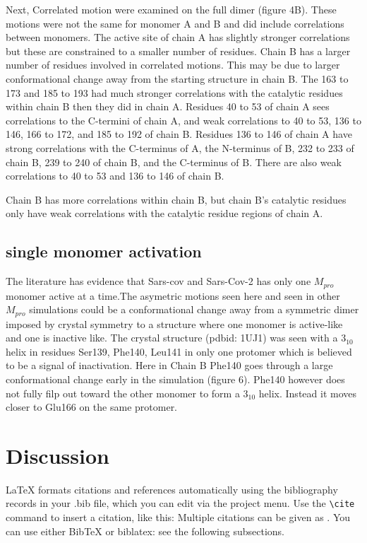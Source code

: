 \documentclass{biophys-new}
\begin{document}
Next, Correlated motion were examined on the full dimer (figure 4B). These motions were not the same for monomer A and B and did include correlations between monomers. The active site of chain A has slightly stronger correlations but these are constrained to a smaller number of residues. Chain B has a larger number of residues involved in correlated motions. This may be due to larger conformational change away from the starting structure in chain B. The 163 to 173 and 185 to 193 had much stronger correlations with the catalytic residues within chain B then they did in chain A. Residues 40 to 53 of chain A sees correlations to the C-termini of chain A, and weak correlations to 40 to 53, 136 to 146, 166 to 172, and 185 to 192 of chain B. Residues 136 to 146 of chain A have strong correlations with the C-terminus of A, the N-terminus of B, 232 to 233 of chain B, 239 to 240 of chain B, and the C-terminus of B. There are also weak correlations to 40 to 53 and 136 to 146 of chain B.

Chain B has more correlations within chain B, but chain B's catalytic residues only have weak correlations with the catalytic residue regions of chain A. 

\subsection*{single monomer activation}

The literature has evidence that Sars-cov and Sars-Cov-2 has only one $M_{pro}$ monomer active at a time.The asymetric motions seen here and seen in other $M_{pro}$ simulations could be a conformational change away from a symmetric dimer imposed by crystal symmetry to a structure where one monomer is active-like and one is inactive like. The crystal structure (pdbid: 1UJ1) was seen with a $3_{10}$ helix in residues Ser139, Phe140, Leu141 in only one protomer which is believed to be a signal of inactivation. Here in Chain B Phe140 goes through a large conformational change early in the simulation (figure 6). Phe140 however does not fully filp out toward the other monomer to form a $3_{10}$ helix. Instead it moves closer to Glu166 on the same protomer.

\section*{Discussion}

\LaTeX{} formats citations and references automatically using the bibliography records in your .bib file, which you can edit via the project menu. Use the \verb|\cite| command to insert a citation, like this: \cite{Chen_Nicholson00} Multiple citations can be given as \cite{Stiles_Bartol01,el-Kareh_etal93,Callaghan91}. You can use either BibTeX or biblatex: see the following subsections.
\end{document}
